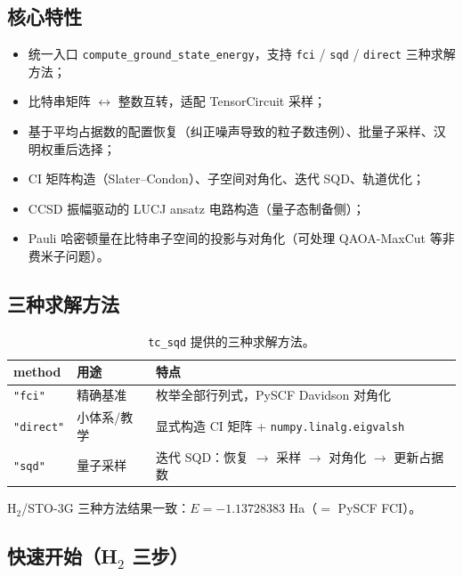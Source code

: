 \documentclass[UTF8,12pt,a4paper]{ctexart}
\newcommand{\Htwo}{H$_2$}
\begin{document}
\subsection{核心特性}

\begin{itemize}[leftmargin=1.6em]
  \item 统一入口 \texttt{compute\_ground\_state\_energy}，支持 \texttt{fci} / \texttt{sqd} / \texttt{direct} 三种求解方法；
  \item 比特串矩阵 $\leftrightarrow$ 整数互转，适配 TensorCircuit 采样；
  \item 基于平均占据数的配置恢复（纠正噪声导致的粒子数违例）、批量子采样、汉明权重后选择；
  \item CI 矩阵构造（Slater--Condon）、子空间对角化、迭代 SQD、轨道优化；
  \item CCSD 振幅驱动的 LUCJ ansatz 电路构造（量子态制备侧）；
  \item Pauli 哈密顿量在比特串子空间的投影与对角化（可处理 QAOA-MaxCut 等非费米子问题）。
\end{itemize}

\subsection{三种求解方法}

\begin{table}[H]
\centering
\caption{\texttt{tc\_sqd} 提供的三种求解方法。}
\begin{tabular}{lll}
\toprule
method & 用途 & 特点 \\
\midrule
\texttt{"fci"} & 精确基准 & 枚举全部行列式，PySCF Davidson 对角化 \\
\texttt{"direct"} & 小体系/教学 & 显式构造 CI 矩阵 + \texttt{numpy.linalg.eigvalsh} \\
\texttt{"sqd"} & 量子采样 & 迭代 SQD：恢复 $\rightarrow$ 采样 $\rightarrow$ 对角化 $\rightarrow$ 更新占据数 \\
\bottomrule
\end{tabular}
\end{table}

\Htwo{}/STO-3G 三种方法结果一致：$E=-1.13728383$ Ha（$=$ PySCF FCI）。

\subsection{快速开始（\texorpdfstring{\Htwo{}}{H2} 三步）}
\end{document}
